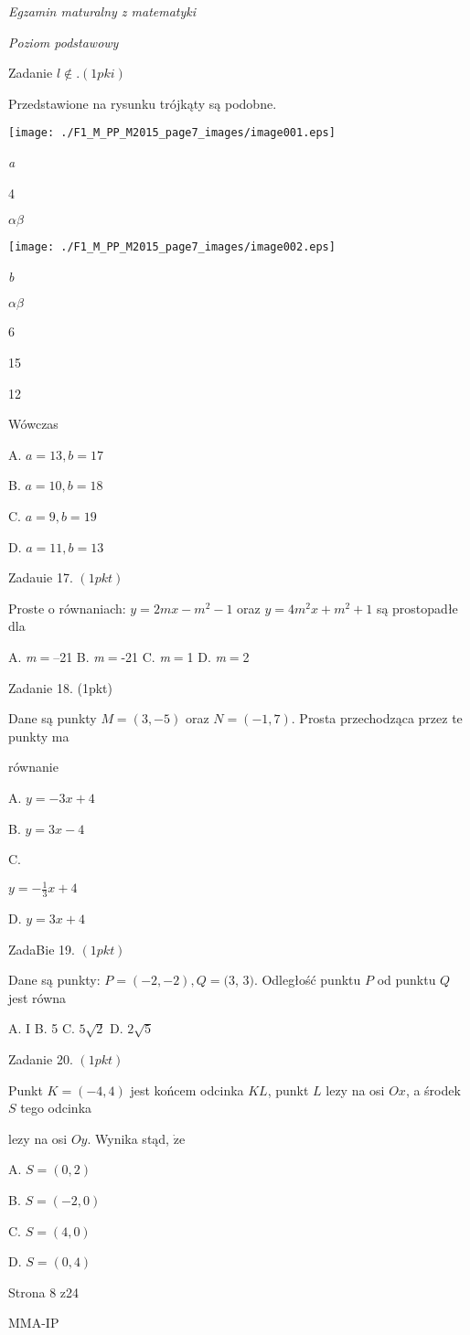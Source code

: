 \documentclass[a4paper,12pt]{article}
\begin{document}
{\it Egzamin maturalny z matematyki}

{\it Poziom podstawowy}

Zadanie $l\not\in. (1pki)$

Przedstawione na rysunku trójkąty są podobne.
\begin{center}
\texttt{[image: ./F1\_M\_PP\_M2015\_page7\_images/image001.eps]}
\end{center}
{\it a}

4

$\alpha  \beta$
\begin{center}
\texttt{[image: ./F1\_M\_PP\_M2015\_page7\_images/image002.eps]}
\end{center}
{\it b}

$\alpha  \beta$

6

15

12

Wówczas

A. $a=13, b=17$

B. $a=10, b=18$

C. $a=9, b=19$

D. $a=11, b=13$

Zadauie 17. $(1pkt)$

Proste o równaniach: $y=2mx-m^{2}-1$ oraz $y=4m^{2}x+m^{2}+1$ są prostopadłe dla

A. {\it m}$=$--21 B. {\it m}$=$-21 C. {\it m}$=$1 D. {\it m}$=$2

Zadanie 18. (1pkt)

Dane są punkty $M=(3,-5)$ oraz $N=(-1,7)$. Prosta przechodząca przez te punkty ma

równanie

A. $y=-3x+4$

B. $y=3x-4$

C.

$y=-\displaystyle \frac{1}{3}x+4$

D. $y=3x+4$

ZadaBie 19. $(1pkt)$

Dane są punkty: $P=(-2,-2), Q=(3$, 3$)$. Odległość punktu $P$ od punktu $Q$ jest równa

A. I B. 5 C. $5\sqrt{2}$ D. $2\sqrt{5}$

Zadanie 20. $(1pkt)$

Punkt $K=(-4,4)$ jest końcem odcinka $KL$, punkt $L$ lezy na osi $Ox$, a środek $S$ tego odcinka

lezy na osi $Oy$. Wynika stąd, $\dot{\mathrm{z}}\mathrm{e}$

A. $S=(0,2)$

B. $S=(-2,0)$

C. $S=(4,0)$

D. $S=(0,4)$

Strona 8 z24

MMA-IP
\end{document}
